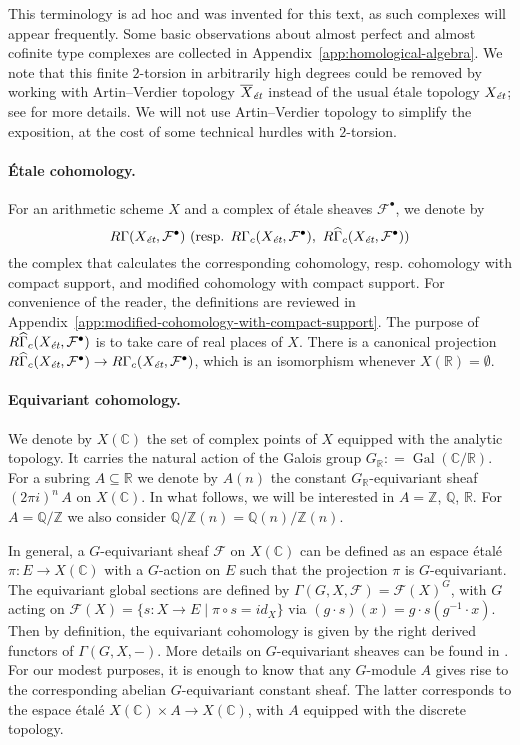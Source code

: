 \documentclass[draft,leqno,12pt]{article}
\theoremstyle{plain}
\theoremstyle{definition}
\DeclareMathOperator{\Gal}{Gal}
\newcommand{\ZZ}{\mathbb{Z}}
\newcommand{\QQ}{\mathbb{Q}}
\newcommand{\RR}{\mathbb{R}}
\newcommand{\CC}{\mathbb{C}}
\newcommand{\dfn}{\mathrel{\mathop:}=}
\newcommand{\et}{\text{\it \'{e}t}}
\begin{document}
This terminology is ad hoc and was invented for this text, as such complexes
will appear frequently. Some basic observations about almost perfect and almost
cofinite type complexes are collected in
Appendix~\ref{app:homological-algebra}. We note that this finite $2$-torsion
in arbitrarily high degrees could be removed by working with Artin--Verdier
topology $\overline{X}_\et$ instead of the usual \'{e}tale topology $X_\et$;
see \cite[Appendix~A]{Flach-Morin-2018} for more details. We will not use
Artin--Verdier topology to simplify the exposition, at the cost of some
technical hurdles with $2$-torsion.

\paragraph{\'{E}tale cohomology.}
For an arithmetic scheme $X$ and a complex of \'{e}tale sheaves
$\mathcal{F}^\bullet$, we denote by
\[ R\Gamma (X_\et, \mathcal{F}^\bullet) ~
\text{(resp. }R\Gamma_c (X_\et, \mathcal{F}^\bullet), ~
R\widehat{\Gamma}_c (X_\et, \mathcal{F}^\bullet)\text{)} \]
the complex that calculates the corresponding cohomology, resp. cohomology with
compact support, and modified cohomology with compact support. For convenience
of the reader, the definitions are reviewed in
Appendix~\ref{app:modified-cohomology-with-compact-support}. The purpose of
$R\widehat{\Gamma}_c (X_\et, \mathcal{F}^\bullet)$ is to take care of real
places of $X$. There is a canonical projection
$R\widehat{\Gamma}_c (X_\et, \mathcal{F}^\bullet) \to R\Gamma_c (X_\et, \mathcal{F}^\bullet)$,
which is an isomorphism whenever $X (\RR) = \emptyset$.

\paragraph{Equivariant cohomology.}
We denote by $X (\CC)$ the set of complex points of $X$ equipped with the
analytic topology. It carries the natural action of the Galois group
$G_\RR \dfn \Gal (\CC/\RR)$. For a subring $A \subseteq \RR$ we denote by
$A (n)$ the constant $G_\RR$-equivariant sheaf $(2\pi i)^n \, A$ on
$X (\CC)$. In what follows, we will be interested in $A = \ZZ$, $\QQ$, $\RR$.
For $A = \QQ/\ZZ$ we also consider $\QQ/\ZZ (n) = \QQ (n)/\ZZ (n)$.

In general, a $G$-equivariant sheaf $\mathcal{F}$ on $X (\CC)$ can be defined as
an espace \'{e}tal\'{e} $\pi\colon E\to X (\CC)$ with a $G$-action on $E$ such that the
projection $\pi$ is $G$-equivariant. The equivariant global sections are defined
by $\Gamma (G,X,\mathcal{F}) = \mathcal{F} (X)^G$, with $G$ acting on
$\mathcal{F} (X) = \{ s\colon X\to E \mid \pi\circ s = id_X \}$ via
$(g\cdot s) (x) = g\cdot s (g^{-1}\cdot x)$. Then by definition, the equivariant
cohomology is given by the right derived functors of $\Gamma (G,X,-)$. More
details on $G$-equivariant sheaves can be found in
\cite[Chapitre~2]{Morin-these}. For our modest purposes, it is enough to know
that any $G$-module $A$ gives rise to the corresponding abelian $G$-equivariant
constant sheaf. The latter corresponds to the espace \'{e}tal\'{e}
$X (\CC)\times A \to X (\CC)$, with $A$ equipped with the discrete topology.
\end{document}
